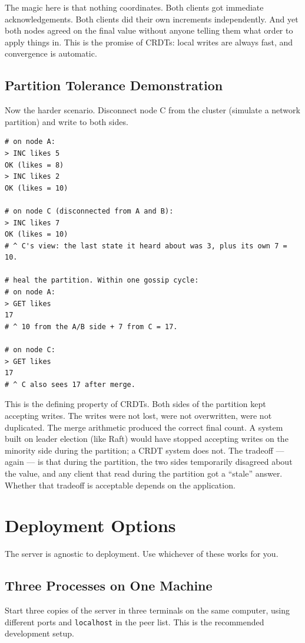 \documentclass[11pt,a4paper]{article}
\begin{document}
The magic here is that nothing coordinates. Both clients got immediate acknowledgements. Both clients did their own increments independently. And yet both nodes agreed on the final value without anyone telling them what order to apply things in. This is the promise of CRDTs: local writes are always fast, and convergence is automatic.

\subsection{Partition Tolerance Demonstration}
Now the harder scenario. Disconnect node C from the cluster (simulate a network partition) and write to both sides.

\begin{codebox}
\begin{lstlisting}
# on node A:
> INC likes 5
OK (likes = 8)
> INC likes 2
OK (likes = 10)

# on node C (disconnected from A and B):
> INC likes 7
OK (likes = 10)
# ^ C's view: the last state it heard about was 3, plus its own 7 = 10.

# heal the partition. Within one gossip cycle:
# on node A:
> GET likes
17
# ^ 10 from the A/B side + 7 from C = 17.

# on node C:
> GET likes
17
# ^ C also sees 17 after merge.
\end{lstlisting}
\end{codebox}

This is the defining property of CRDTs. Both sides of the partition kept accepting writes. The writes were not lost, were not overwritten, were not duplicated. The merge arithmetic produced the correct final count. A system built on leader election (like Raft) would have stopped accepting writes on the minority side during the partition; a CRDT system does not. The tradeoff --- again --- is that during the partition, the two sides temporarily disagreed about the value, and any client that read during the partition got a ``stale'' answer. Whether that tradeoff is acceptable depends on the application.

\section{Deployment Options}

The server is agnostic to deployment. Use whichever of these works for you.

\subsection{Three Processes on One Machine}
Start three copies of the server in three terminals on the same computer, using different ports and \texttt{localhost} in the peer list. This is the recommended development setup.
\end{document}
